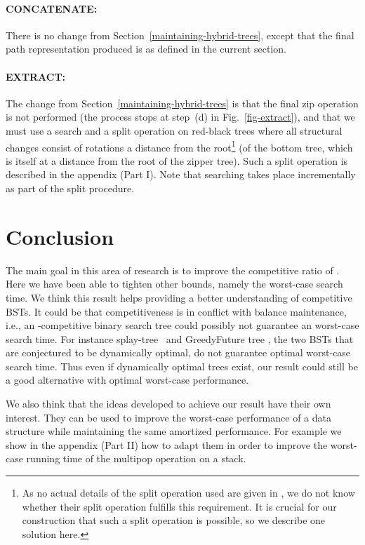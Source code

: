 \documentclass[letterpaper,11pt]{article}
\newcommand{\bottomtree}{bottom tree}
\begin{document}
\paragraph{CONCATENATE:} There is no change from
Section~\ref{maintaining-hybrid-trees}, except that the final path
representation produced is as defined in the current section.

\paragraph{EXTRACT:} The change from Section~\ref{maintaining-hybrid-trees}
is that the final zip operation is not performed (the process stops at
step~(d) in Fig.~\ref{fig-extract}), and that we must use a search and a
split operation on red-black trees where all structural changes consist of
rotations a distance  from the root\footnote{As no actual details of
the split operation used are given in \cite{tango}, we do not know whether
their split operation fulfills this requirement. It is crucial for our
construction that such a split operation is possible, so we describe one
solution here.} (of the \bottomtree{}, which is itself at a distance 
from the root of the zipper tree). Such a split operation is described in
the appendix (Part I). Note that searching takes place incrementally as part of the
split procedure.

\section{Conclusion}

The main goal in this area of research is to improve the competitive ratio of . Here we have been able to tighten other bounds, namely the worst-case search time. We think this result helps providing a better understanding of competitive BSTs. It could be that competitiveness is in conflict with balance maintenance, i.e., an -competitive binary search tree could possibly not  guarantee an  worst-case search time. For instance splay-tree~\cite{splay} and GreedyFuture tree \cite{munro2000competitiveness, geoBST}, the two BSTs that are conjectured to be dynamically optimal, do not guarantee optimal worst-case search time. Thus even if dynamically optimal trees exist, our result could still be a good alternative with optimal worst-case performance. 

We also think that the ideas developed to achieve our result have their own interest. They can be used to improve the worst-case performance of a data structure while maintaining the same amortized performance. For example we show in the appendix (Part II) how to adapt them in order to improve the worst-case running time of the multipop operation on a stack. 
\end{document}
